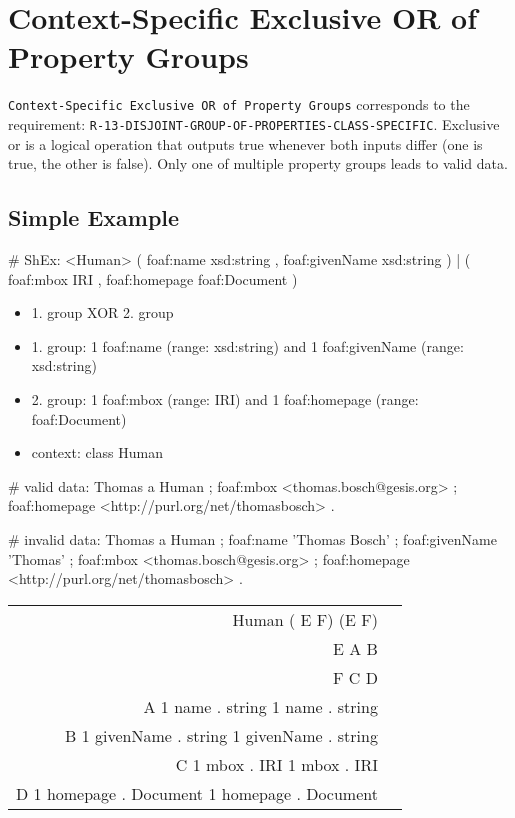 \documentclass{llncs}
\newcommand{\ms}[1]{\texttt{#1}}
\newenvironment{DL}{
\vspace{0cm}
	\begin{center}
  \begin{tabular}{r l}

}{
  \end{tabular}
	\end{center}
}
\begin{document}
\section{Context-Specific Exclusive OR of Property Groups}

\ms{Context-Specific Exclusive OR of Property Groups} corresponds to the requirement:
\ms{R-13-DISJOINT-GROUP-OF-PROPERTIES-CLASS-SPECIFIC}.
Exclusive or is a logical operation that outputs true whenever both inputs differ (one is true, the other is false).
Only one of multiple property groups leads to valid data.

\subsection{Simple Example}

\begin{ex}
# ShEx:
<Human> { 
    (  
        foaf:name xsd:string ,
        foaf:givenName xsd:string ) 
    |
    (
        foaf:mbox IRI ,
        foaf:homepage foaf:Document ) }
\end{ex}

\begin{itemize}
  \item 1. group XOR 2. group
	\item 1. group: 1 foaf:name (range: xsd:string) and 1 foaf:givenName (range: xsd:string)
	\item 2. group: 1 foaf:mbox (range: IRI) and 1 foaf:homepage (range: foaf:Document) 
	\item context: class Human
\end{itemize}

\begin{ex}
# valid data:
Thomas
    a Human ;
    foaf:mbox <thomas.bosch@gesis.org> ;
    foaf:homepage <http://purl.org/net/thomasbosch> .
\end{ex}

\begin{ex}
# invalid data:
Thomas
    a Human ;
    foaf:name 'Thomas Bosch' ;
    foaf:givenName 'Thomas' ;
    foaf:mbox <thomas.bosch@gesis.org> ;
    foaf:homepage <http://purl.org/net/thomasbosch> .
\end{ex}

\begin{DL}
Human  ( E  F)  (E   F) \\ 
E  A  B \\
F  C  D \\
A   1 name . string   1 name . string \\
B   1 givenName . string   1 givenName . string \\
C   1 mbox . IRI   1 mbox . IRI \\
D   1 homepage . Document   1 homepage . Document \\
\end{DL}
\end{document}
